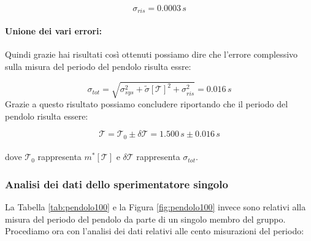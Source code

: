 \begin{equation*}
	\sigma_{ris} = 0.0003\,s 
\end{equation*}

\paragraph{Unione dei vari errori:}
Quindi grazie hai risultati così ottenuti possiamo dire che l'errore complessivo sulla misura del periodo del pendolo risulta essre:

\begin{equation}
	\sigma_{tot} = \sqrt{\sigma_{sys}^2 + \tilde{\sigma}[\mathcal{T}]^2 + \sigma_{ris}^2} = 0.016\,s
\end{equation}
Grazie a questo risultato possiamo concludere riportando che il periodo del pendolo risulta essere:

\begin{equation}
	\mathcal{T} = \mathcal{T}_0 \pm \delta\mathcal{T} = 1.500\,s \pm 0.016\,s
\end{equation}\\
dove $\mathcal{T}_0$ rappresenta $m^*[\mathcal{T}]$ e $\delta\mathcal{T}$ rappresenta $\sigma_{tot}$.

\subsubsection{Analisi dei dati dello sperimentatore singolo}

La Tabella \ref{tab:pendolo100} e la Figura \ref{fig:pendolo100} invece sono relativi alla misura del periodo del pendolo da parte di un singolo membro del gruppo.
Procediamo ora con l'analisi dei dati relativi alle cento misurazioni del periodo:

